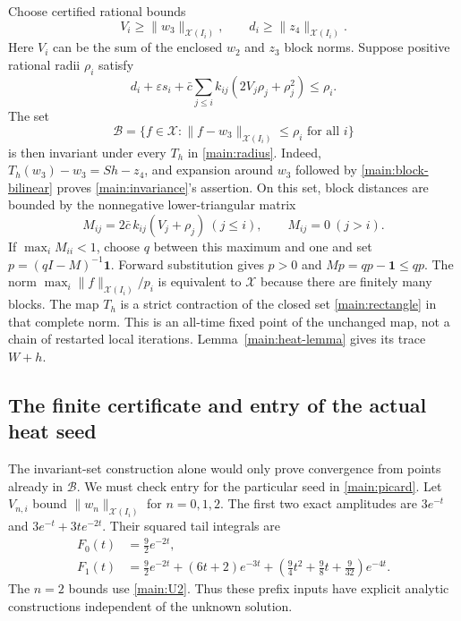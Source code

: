 Choose certified rational bounds
\begin{equation}
 V_i\ge\|w_3\|_{\mathcal X(I_i)},\qquad
 d_i\ge\|z_4\|_{\mathcal X(I_i)}.\label{main:Vd}
\end{equation}
Here $V_i$ can be the sum of the enclosed $w_2$ and $z_3$ block norms.
Suppose positive rational radii $\rho_i$ satisfy
\begin{equation}
 d_i+\varepsilon s_i+
 \bar c\sum_{j\le i}k_{ij}(2V_j\rho_j+\rho_j^2)\le\rho_i.
 \label{main:invariance}
\end{equation}
The set
\begin{equation}
 \mathcal B=\{f\in\mathcal X:
       \|f-w_3\|_{\mathcal X(I_i)}\le\rho_i\text{ for all }i\}
 \label{main:rectangle}
\end{equation}
is then invariant under every $T_h$ in \eqref{main:radius}. Indeed,
$T_h(w_3)-w_3=Sh-z_4$, and expansion around $w_3$ followed by
\eqref{main:block-bilinear} proves \eqref{main:invariance}'s assertion.
On this set, block distances are bounded by the nonnegative lower-triangular
matrix
\begin{equation}
 M_{ij}=2\bar c\,k_{ij}(V_j+\rho_j)\ (j\le i),
 \qquad M_{ij}=0\ (j>i).\label{main:M}
\end{equation}
If $\max_i M_{ii}<1$, choose $q$ between this maximum and one and set
$p=(qI-M)^{-1}\mathbf1$. Forward substitution gives $p>0$ and
$Mp=qp-\mathbf1\le qp$. The norm
$\max_i\|f\|_{\mathcal X(I_i)}/p_i$ is equivalent to $\mathcal X$
because there are finitely many blocks. The map $T_h$ is a strict contraction
of the closed set \eqref{main:rectangle} in that complete norm.
This is an all-time fixed point of the unchanged map, not a chain of restarted
local iterations. Lemma~\ref{main:heat-lemma} gives its trace $W+h$.

\subsection{The finite certificate and entry of the actual heat seed}
\label{main:certificate}

The invariant-set construction alone would only prove convergence from
points already in $\mathcal B$. We must check entry for the particular seed
in \eqref{main:picard}. Let $V_{n,i}$ bound
$\|w_n\|_{\mathcal X(I_i)}$ for $n=0,1,2$. The first two exact amplitudes
are $3e^{-t}$ and $3e^{-t}+3te^{-2t}$. Their squared tail integrals are
\begin{align}
 F_0(t)&=\tfrac92e^{-2t},\nonumber\\
 F_1(t)&=\tfrac92e^{-2t}+(6t+2)e^{-3t}
            +(\tfrac94t^2+\tfrac98t+\tfrac9{32})e^{-4t}.
 \label{main:prefix-moments}
\end{align}
The $n=2$ bounds use \eqref{main:U2}. Thus these prefix inputs have explicit
analytic constructions independent of the unknown solution.

